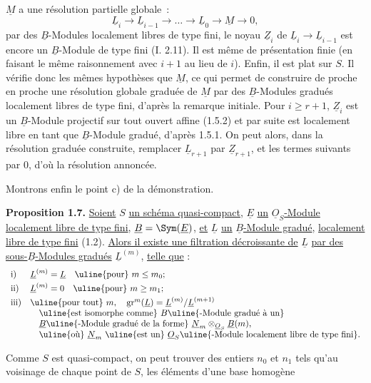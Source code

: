 
\(\underline{M}\) a une
résolution partielle globale~:
\[
  \underline{L}_i\longrightarrow \underline{L}_{i-1}\longrightarrow\ldots\longrightarrow \underline{L}_0\longrightarrow \underline{M}\longrightarrow 0,
\]
par des \(\underline{B}\)-Modules localement libres de type fini, le noyau \(\underline{Z}_i\) de \(\underline{L}_i\to \underline{L}_{i-1}\) est encore un \(\underline{B}\)-Module de type fini (I. 2.11). Il est même de présentation finie (en faisant le même raisonnement avec \(i+1\) au lieu de \(i\)). Enfin, il est plat sur \(S\). Il vérifie donc les mêmes hypothèses que \(\underline{M}\), ce qui permet de construire de proche en proche une résolution globale graduée de \(\underline{M}\) par des \(\underline{B}\)-Modules gradués localement libres de type fini, d'après la remarque initiale. Pour \(i\geq r+1\), \(\underline{Z}_i\) est un \(\underline{B}\)-Module projectif sur tout ouvert affine (1.5.2) et par suite est localement libre en tant que \(\underline{B}\)-Module gradué, d'après 1.5.1. On peut alors, dans la résolution graduée construite, remplacer \(\underline{L}_{r+1}\) par \(\underline{Z}_{r+1}\), et les termes suivants par \(0\), d'où la résolution annoncée.

Montrons enfin le point c) de la démonstration.

\textbf{Proposition 1.7.} \uline{Soient} \(S\) \uline{un schéma quasi-compact}, \(\underline{E}\) \uline{un} \(\underline{O}_S\)\uline{-Module localement libre de type fini}, \(\underline{B}=\Sym(\underline{E})\), \uline{et} \(\underline{L}\) \uline{un} \(\underline{B}\)\uline{-Module gradué}, \uline{localement libre de type fini} (1.2). \uline{Alors il existe une filtration décroissante de} \(\underline{L}\) \uline{par des sous-}\(\underline{B}\)\uline{-Modules gradués} \(\underline{L}^{(m)}\), \uline{telle que} :
\[
\begin{array}{ll}
\text{i)}& \underline{L}^{(m)}=\underline{L}\quad\text{\uline{pour} }m\leq m_0;\\[1mm]
\text{ii)}& \underline{L}^{(m)}=0\quad\text{\uline{pour} }m\geq m_1;\\[1mm]
\text{iii)}& \text{\uline{pour tout} }m,\quad \operatorname{gr}^m(\underline{L})=\underline{L}^{(m)}/\underline{L}^{(m+1)}\\
&\quad \text{\uline{est isomorphe comme} }B\text{\uline{-Module gradué à un}}\\
&\quad \underline{B}\text{\uline{-Module gradué de la forme} }\underline{N}_m\otimes_{\underline{O}_S}\underline{B}(m),\\
&\quad \text{\uline{où} }\underline{N}_m\text{ \uline{est un} }\underline{O}_S\text{\uline{-Module localement libre de type fini}.}
\end{array}
\]

Comme \(S\) est quasi-compact, on peut trouver des entiers \(n_0\) et \(n_1\) tels qu'au voisinage de chaque point de \(S\), les éléments d'une base homogène 
